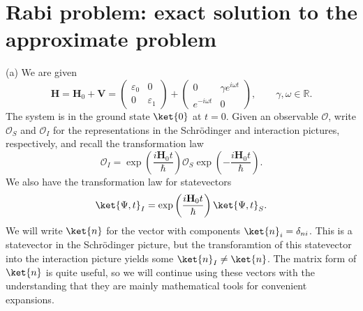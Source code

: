 \documentclass[11pt, letterpaper]{article}
\begin{document}
\section{Rabi problem: exact solution to the approximate problem}

(a) We are given
\[
	\mathbf{H} =\mathbf{H}_0+\mathbf{V} =\begin{pmatrix}
	\varepsilon _0 & 0 \\
	0 & \varepsilon _1
	\end{pmatrix}+\begin{pmatrix}
	0 & \gamma e^{i\omega t}  \\
	e^{-i\omega t}  & 0
	\end{pmatrix},\qquad \gamma ,\omega \in\mathbb{R} 
.\]
The system is in the ground state $\ket{0}$ at $t=0$. Given an observable $\mathcal{O} $, write $\mathcal{O}_S$ and $\mathcal{O} _I$ for the representations in the Schr\"odinger and interaction pictures, respectively, and recall the transformation law
\[
	\mathcal{O}_I = \exp \left( \frac{i \mathbf{H} _0t}{\hbar}  \right) \mathcal{O}_S \exp \left( -\frac{i \mathbf{H} _0t}{\hbar}  \right) 
.\]
We also have the transformation law for statevectors
\[
	\ket{\Psi ,t}_I=\exp \left( \frac{i \mathbf{H} _0 t}{\hbar}  \right) \ket{\Psi ,t}_S
.\]
We will write $\ket{n}$ for the vector with components $\ket{n}_i=\delta_{ni} $. This is a statevector in the Schr\"odinger picture, but the transforamtion of this statevector into the interaction picture yields some $\ket{n}_I \neq \ket{n}$. The matrix form of $\ket{n}$ is quite useful, so we will continue using these vectors with the understanding that they are mainly mathematical tools for convenient expansions.
\end{document}
